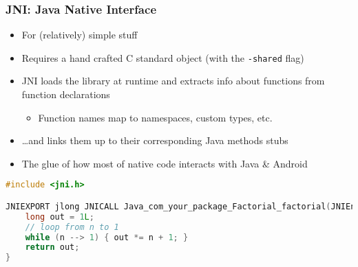 \documentclass[10pt,mathserif]{beamer}
\begin{document}
	\begin{frame}[fragile]
		\frametitle{JNI: Java Native Interface}

		\begin{itemize}
			\item For (relatively) simple stuff
			\item Requires a hand crafted C standard object (with the \lstinline{-shared} flag)
			\item JNI loads the library at runtime and extracts info about functions from function declarations
			\begin{itemize}
				\item Function names map to namespaces, custom types, etc.
			\end{itemize}
			\item \dots and links them up to their corresponding Java methods stubs
			\item The glue of how most of native code interacts with Java \& Android
		\end{itemize}


		\begin{lstlisting}[language=c]
#include <jni.h>

JNIEXPORT jlong JNICALL Java_com_your_package_Factorial_factorial(JNIEnv *jenv, jint n) {
	long out = 1L;
	// loop from n to 1
	while (n --> 1) { out *= n + 1; }
	return out;
}
		\end{lstlisting}
	\end{frame}
\end{document}
